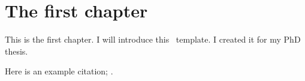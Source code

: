 \chapter{The first chapter} %
\label{ch:intro} %

This is the first chapter. 
I will introduce this \LaTeXe\ template.
I created it for my PhD thesis.

Here is an example citation; \cite{Example2019}.




